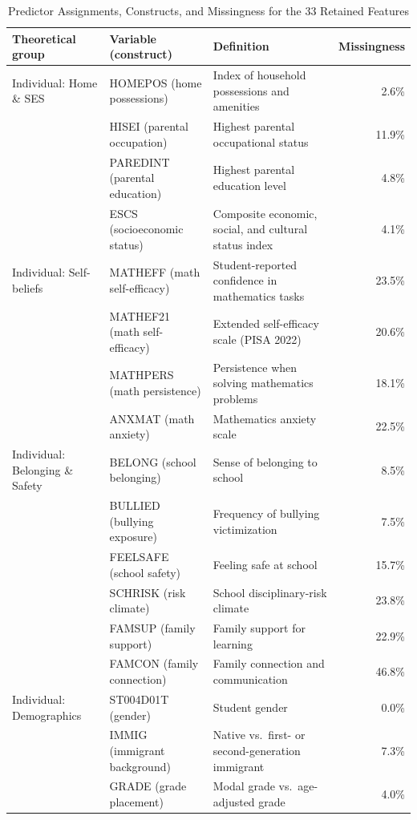 \documentclass[journal]{IEEEtran}
\begin{document}
\begin{table}[!t]
\centering
\caption{Predictor Assignments, Constructs, and Missingness for the 33 Retained Features}
\label{tab:supp-features}
\small
\begin{tabular}{@{}p{3.0cm}p{5.2cm}p{5.2cm}r@{}}
\toprule
\textbf{Theoretical group} & \textbf{Variable (construct)} & \textbf{Definition} & \textbf{Missingness} \\
\midrule
Individual: Home \& SES & HOMEPOS (home possessions) & Index of household possessions and amenities & 2.6\% \\
 & HISEI (parental occupation) & Highest parental occupational status & 11.9\% \\
 & PAREDINT (parental education) & Highest parental education level & 4.8\% \\
 & ESCS (socioeconomic status) & Composite economic, social, and cultural status index & 4.1\% \\
\addlinespace
Individual: Self-beliefs & MATHEFF (math self-efficacy) & Student-reported confidence in mathematics tasks & 23.5\% \\
 & MATHEF21 (math self-efficacy) & Extended self-efficacy scale (PISA 2022) & 20.6\% \\
 & MATHPERS (math persistence) & Persistence when solving mathematics problems & 18.1\% \\
 & ANXMAT (math anxiety) & Mathematics anxiety scale & 22.5\% \\
\addlinespace
Individual: Belonging \& Safety & BELONG (school belonging) & Sense of belonging to school & 8.5\% \\
 & BULLIED (bullying exposure) & Frequency of bullying victimization & 7.5\% \\
 & FEELSAFE (school safety) & Feeling safe at school & 15.7\% \\
 & SCHRISK (risk climate) & School disciplinary-risk climate & 23.8\% \\
 & FAMSUP (family support) & Family support for learning & 22.9\% \\
 & FAMCON (family connection) & Family connection and communication & 46.8\% \\
\addlinespace
Individual: Demographics & ST004D01T (gender) & Student gender & 0.0\% \\
 & IMMIG (immigrant background) & Native vs.\ first- or second-generation immigrant & 7.3\% \\
 & GRADE (grade placement) & Modal grade vs.\ age-adjusted grade & 4.0\% \\

\end{tabular}
\end{table}
\end{document}

